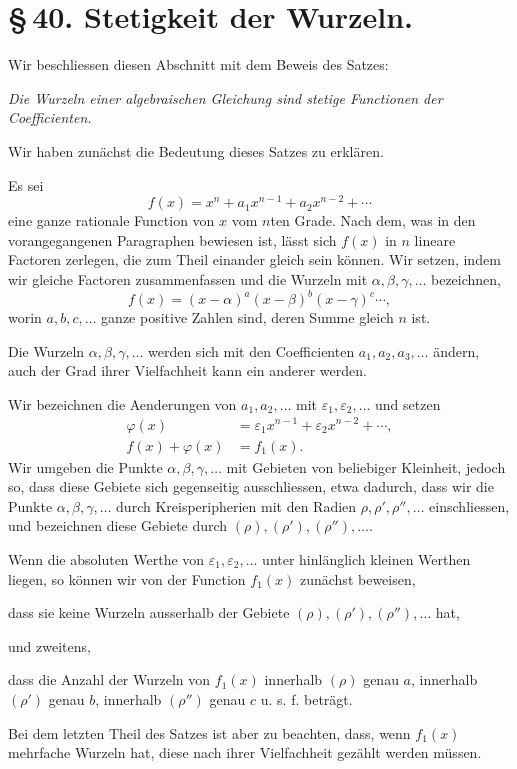 \documentclass[11pt]{article}
\begin{document}
\section*{\S\,40. Stetigkeit der Wurzeln.}

Wir beschliessen diesen Abschnitt mit dem Beweis des Satzes:
\begin{center}
\emph{Die Wurzeln einer algebraischen Gleichung sind stetige Functionen der Coefficienten.}
\end{center}

Wir haben zunächst die Bedeutung dieses Satzes zu erklären.

Es sei
\begin{equation}
 f(x)=x^n+a_1x^{n-1}+a_2x^{n-2}+\cdots
\tag{1}
\end{equation}
eine ganze rationale Function von $x$ vom $n$ten Grade. Nach dem, was in den vorangegangenen Paragraphen bewiesen ist, lässt sich $f(x)$ in $n$ lineare Factoren zerlegen, die zum Theil einander gleich sein können. Wir setzen, indem wir gleiche Factoren zusammenfassen und die Wurzeln mit $\alpha,\beta,\gamma,
\ldots$ bezeichnen,
\begin{equation}
 f(x)=(x-\alpha)^a(x-\beta)^b(x-\gamma)^c\cdots,
\tag{2}
\end{equation}
worin $a,b,c,
\ldots$ ganze positive Zahlen sind, deren Summe gleich $n$ ist.

Die Wurzeln $\alpha,\beta,\gamma,
\ldots$ werden sich mit den Coefficienten $a_1,a_2,a_3,
\ldots$ ändern, auch der Grad ihrer Vielfachheit kann ein anderer werden.

Wir bezeichnen die Aenderungen von $a_1,a_2,
\ldots$ mit $\varepsilon_1,\varepsilon_2,
\ldots$ und setzen
\begin{align}
 \varphi(x)&=\varepsilon_1x^{n-1}+\varepsilon_2x^{n-2}+\cdots,
\tag{3}\\
 f(x)+\varphi(x)&=f_1(x).
\tag{4}
\end{align}
Wir umgeben die Punkte $\alpha,\beta,\gamma,
\ldots$ mit Gebieten von beliebiger Kleinheit, jedoch so, dass diese Gebiete sich gegenseitig ausschliessen, etwa dadurch, dass wir die Punkte $\alpha,\beta,\gamma,
\ldots$ durch Kreisperipherien mit den Radien $\rho,\rho',\rho'',
\ldots$ einschliessen, und bezeichnen diese Gebiete durch $(\rho),(\rho'),(\rho''),\ldots$.

Wenn die absoluten Werthe von $\varepsilon_1,\varepsilon_2,
\ldots$ unter hinlänglich kleinen Werthen liegen, so können wir von der Function $f_1(x)$ zunächst beweisen,
\begin{center}
dass sie keine Wurzeln ausserhalb der Gebiete $(\rho),(\rho'),(\rho''),\ldots$ hat,
\end{center}
und zweitens,
\begin{center}
dass die Anzahl der Wurzeln von $f_1(x)$ innerhalb $(\rho)$ genau $a$, innerhalb $(\rho')$ genau $b$, innerhalb $(\rho'')$ genau $c$ u. s. f. beträgt.
\end{center}
Bei dem letzten Theil des Satzes ist aber zu beachten, dass, wenn $f_1(x)$ mehrfache Wurzeln hat, diese nach ihrer Vielfachheit gezählt werden müssen.
\end{document}
